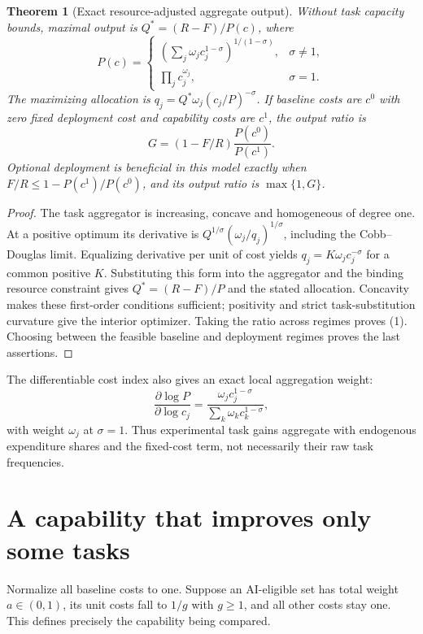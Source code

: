 \documentclass[11pt,a4paper]{article}
\newtheorem{theorem}{Theorem}[section]
\theoremstyle{definition}
\theoremstyle{remark}
\begin{document}
\begin{theorem}[Exact resource-adjusted aggregate output]
Without task capacity bounds, maximal output is $Q^*=(R-F)/P(c)$, where
\[
 P(c)=\begin{cases}
 (\sum_j\omega_jc_j^{1-\sigma})^{1/(1-\sigma)},&\sigma\ne1,\\
 \prod_jc_j^{\omega_j},&\sigma=1.
 \end{cases}
\]
The maximizing allocation is $q_j=Q^*\omega_j(c_j/P)^{-\sigma}$. If baseline costs are $c^0$ with zero fixed deployment cost and capability costs are $c^1$, the output ratio is
\[
 G=(1-F/R)\frac{P(c^0)}{P(c^1)}.\tag{1}
\]
Optional deployment is beneficial in this model exactly when $F/R\leq1-P(c^1)/P(c^0)$, and its output ratio is $\max\{1,G\}$.
\end{theorem}
\begin{proof}
The task aggregator is increasing, concave and homogeneous of degree one. At a positive optimum its derivative is $Q^{1/\sigma}(\omega_j/q_j)^{1/\sigma}$, including the Cobb--Douglas limit. Equalizing derivative per unit of cost yields $q_j=K\omega_jc_j^{-\sigma}$ for a common positive $K$. Substituting this form into the aggregator and the binding resource constraint gives $Q^*=(R-F)/P$ and the stated allocation. Concavity makes these first-order conditions sufficient; positivity and strict task-substitution curvature give the interior optimizer. Taking the ratio across regimes proves (1). Choosing between the feasible baseline and deployment regimes proves the last assertions.
\end{proof}

The differentiable cost index also gives an exact local aggregation weight:
\[
 \frac{\partial\log P}{\partial\log c_j}
 =\frac{\omega_jc_j^{1-\sigma}}{\sum_k\omega_kc_k^{1-\sigma}},
\]
with weight $\omega_j$ at $\sigma=1$. Thus experimental task gains aggregate with endogenous expenditure shares and the fixed-cost term, not necessarily their raw task frequencies.

\section{A capability that improves only some tasks}
Normalize all baseline costs to one. Suppose an AI-eligible set has total weight $a\in(0,1)$, its unit costs fall to $1/g$ with $g\geq1$, and all other costs stay one. This defines precisely the capability being compared.
\end{document}
